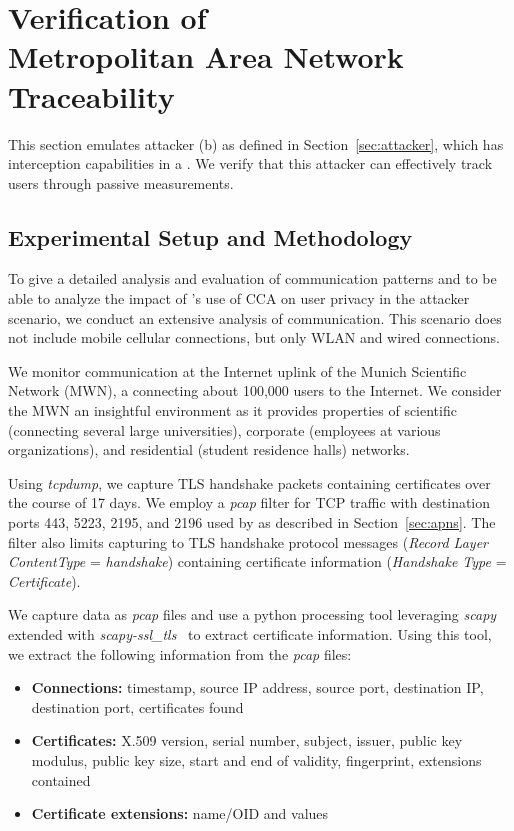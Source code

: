 \section{Verification of \\Metropolitan Area Network Traceability}\label{sec:verloc}
\label{sec:results}
This section emulates attacker (b) as defined in Section~\ref{sec:attacker}, which has interception capabilities in a \man.
We verify that this attacker can effectively track users through passive measurements.

\subsection{Experimental Setup and Methodology}\label{sec:exp}
To give a detailed analysis and evaluation of {\apns} communication patterns and
to be able to analyze the impact of {\apns}'s use of CCA on user privacy in the \man attacker scenario, we conduct an
extensive analysis of {\apns} communication. This scenario does not include
mobile cellular connections, but only WLAN and wired connections.


We monitor {\apns} communication at the Internet uplink of the Munich Scientific Network (MWN), a \man connecting about 100,000 users to the Internet.
We consider the MWN an insightful environment as it provides properties of scientific (connecting several large universities), corporate (employees at various organizations), and residential (student residence halls) networks.

Using \textit{tcpdump}, we capture {\apns} TLS handshake packets containing certificates over the course of 17 days.
We employ a \textit{pcap} filter for TCP traffic with destination ports 443, 5223, 2195, and 2196 used by {\apns} as described in Section~\ref{sec:apns}.
The filter also limits capturing to TLS handshake protocol
messages (\textit{Record Layer ContentType} = \textit{handshake}) containing certificate
information (\textit{Handshake Type} = \textit{Certificate}).

We capture data as \textit{pcap} files and use a python processing tool
leveraging \textit{scapy}~\cite{scapy} extended with
\textit{scapy-ssl\_tls}~\cite{scapytls} to extract certificate information.
Using this tool, we extract the following information from the \textit{pcap} files:

\begin{itemize}
	\item \textbf{Connections: }%
	timestamp, source IP address, source port, destination IP, destination port, certificates found
	\item \textbf{Certificates: }%
	X.509 version, serial number, subject, issuer, public key modulus, public key size, start and end of validity, fingerprint, extensions contained
	\item \textbf{Certificate extensions: }%
	name/OID and values
\end{itemize}

